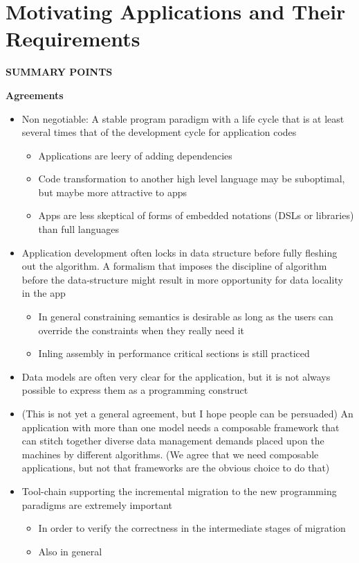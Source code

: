\chapter{Motivating Applications and Their Requirements}
\label{ch:apps}

%
%
\noindent
{\large\textbf{SUMMARY POINTS}}

$ $\\
\noindent
\textbf{Agreements}
\begin{itemize}
  \item Non negotiable: A stable program paradigm with a life cycle that is at least several times that of the development cycle for application codes
    \begin{itemize}
      \item Applications are leery of adding dependencies
      \item Code transformation to another high level language may be suboptimal, but maybe more attractive to apps
      \item Apps are less skeptical of forms of embedded notations (DSLs or libraries) than full languages
    \end{itemize}
  \item Application development often locks in data structure before fully fleshing out the algorithm.
    A formalism that imposes the discipline of algorithm before the data-structure might result in more opportunity for data locality in the app
    \begin{itemize}
      \item In general constraining semantics is desirable as long as the users can override the constraints when they really need it
      \item Inling assembly in performance critical sections is still practiced
    \end{itemize}
  \item Data models are often very clear for the application, but it is not always possible to express them as a programming construct
  \item (This is not yet a general agreement, but I hope people can be persuaded)
    An application with more than one model needs a composable framework that can stitch together diverse data management demands placed upon the machines by different algorithms.
    (We agree that we need composable applications, but not that frameworks are the obvious choice to do that)
  \item Tool-chain supporting the incremental migration to the new programming paradigms are extremely important 
    \begin{itemize}
      \item In order to verify the correctness in the intermediate stages of migration  
      \item Also in general
    \end{itemize}
\end{itemize}


